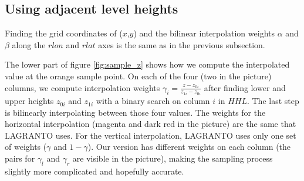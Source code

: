 

\subsection{Using adjacent level heights}\label{sec:zsampling_mine}
Finding the grid coordinates of ($x$,$y$) and the bilinear interpolation weights $\alpha$ and $\beta$ along the $rlon$ and $rlat$ axes is the same as in the previous subsection.

The lower part of figure \ref{fig:sample_z} shows how we compute the interpolated value at the orange sample point. On each of the four (two in the picture) columns, we compute interpolation weights $\gamma_i = \frac{z-z_{0i}}{z_{1i}-z_{0i}}$ after finding lower and upper heights $z_{0i}$ and $z_{1i}$ with a binary search on column $i$ in $HHL$. The last step is bilinearly interpolating between those four values. The weights for the horizontal interpolation (magenta and dark red in the picture) are the same that LAGRANTO uses. For the vertical interpolation, LAGRANTO uses only one set of weights ($\gamma$ and $1-\gamma$). Our version has different weights on each column (the pairs for $\gamma_l$ and $\gamma_r$ are visible in the picture), making the sampling process slightly more complicated and hopefully accurate.

